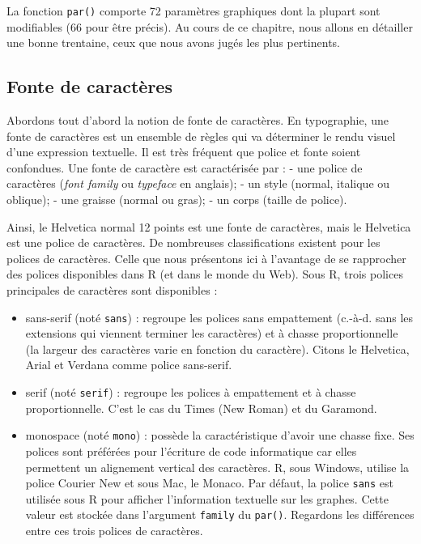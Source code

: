 \documentclass[]{article}
\providecommand{\tightlist}{%
  \setlength{\itemsep}{0pt}\setlength{\parskip}{0pt}}
\begin{document}
La fonction \texttt{par()} comporte 72 paramètres graphiques dont la plupart sont modifiables (66 pour être précis). Au cours de ce chapitre, nous allons en détailler une bonne trentaine, ceux que nous avons jugés les plus pertinents.

\hypertarget{fonte-de-caractuxe8res}{%
\subsection{Fonte de caractères}\label{fonte-de-caractuxe8res}}

Abordons tout d'abord la notion de fonte de caractères. En typographie, une fonte de caractères est un ensemble de règles qui va déterminer le rendu visuel d'une expression textuelle. Il est très fréquent que police et fonte soient confondues. Une fonte de caractère est caractérisée par :
- une police de caractères (\emph{font family} ou \emph{typeface} en anglais);
- un style (normal, italique ou oblique);
- une graisse (normal ou gras);
- un corps (taille de police).

Ainsi, le Helvetica normal 12 points est une fonte de caractères, mais le
Helvetica est une police de caractères. De nombreuses classifications existent
pour les polices de caractères. Celle que nous présentons ici à l'avantage de se
rapprocher des polices disponibles dans R (et dans le monde du Web). Sous R,
trois polices principales de caractères sont disponibles :

\begin{itemize}
\tightlist
\item
  sans-serif (noté \texttt{sans}) : regroupe les polices sans empattement (c.-à-d. sans les extensions qui viennent terminer les caractères) et à chasse proportionnelle (la largeur des caractères varie en fonction du caractère). Citons le Helvetica, Arial et Verdana comme police sans-serif.
\item
  serif (noté \texttt{serif}) : regroupe les polices à empattement et à chasse proportionnelle. C'est le cas du Times (New Roman) et du Garamond.
\item
  monospace (noté \texttt{mono}) : possède la caractéristique d'avoir une chasse fixe. Ses polices sont préférées pour l'écriture de code informatique car elles permettent un alignement vertical des caractères. R, sous Windows, utilise la police Courier New et sous Mac, le Monaco.
  Par défaut, la police \texttt{sans} est utilisée sous R pour afficher l'information textuelle sur les graphes. Cette valeur est stockée dans l'argument \texttt{family} du \texttt{par()}. Regardons les différences entre ces trois polices de caractères.
\end{itemize}
\end{document}
